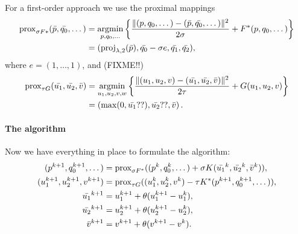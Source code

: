 For a first-order approach we use the proximal mappings
\begin{align*}
    \Prox_{\sigma F*}(\bar{p},\bar{q_0},\dots)
    &= \argmin_{p,q_0,\dots} \left\{
        \frac{\|
            (p,q_0,\dots)-(\bar{p},\bar{q_0},\dots)
        \|^2}{2\sigma} + F^*(p,q_0,\dots)
    \right\} \\
    &= (
        \proj_{\lambda,2}(\bar{p}),
        \bar{q_0}-\sigma e,
        \bar{q_1},
        \bar{q_2}
   ),
\end{align*}
where $e = (1,\dots,1)$, and (FIXME!!)
\begin{align*}
    \Prox_{\tau G}(\bar{u_1},\bar{u_2},\bar{v})
    &= \argmin_{u_1,u_2,v,w} \left\{
        \frac{\|
            (u_1,u_2,v)-(\bar{u_1},\bar{u_2},\bar{v})
        \|^2}{2\tau} + G(u_1,u_2,v)
    \right\} \\
    &= \left(
        \max(0,\bar{u_1}??),
        \bar{u_2}??,
        \bar{v}
    \right).
\end{align*}

\paragraph{The algorithm}

Now we have everything in place to formulate the algorithm:
\begin{align*}
    (p^{k+1},q_0^{k+1},\dots) &= \operatorname{prox}_{\sigma F^*}(
        (p^{k},q_0^{k},\dots)
        + \sigma K(\bar{u_1}^{k},\bar{u_2}^{k},\bar{v}^{k})
    ), \\
    (u_1^{k+1},u_2^{k+1},v^{k+1}) &= \operatorname{prox}_{\tau G}(
        (u_1^{k},u_2^{k},v^{k})
        - \tau K^*(p^{k+1},q_0^{k+1},\dots)
    ), \\
    \bar{u_1}^{k+1} &= u_1^{k+1} + \theta(u_1^{k+1}-u_1^{k}), \\
    \bar{u_2}^{k+1} &= u_2^{k+1} + \theta(u_2^{k+1}-u_2^{k}), \\
    \bar{v}^{k+1} &= v^{k+1} + \theta(v^{k+1}-v^{k}).
\end{align*}

